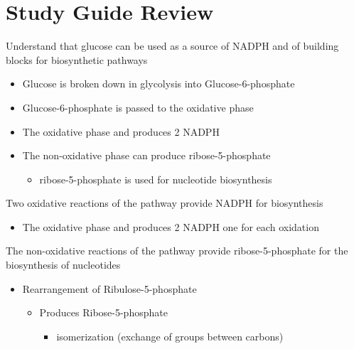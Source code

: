 \documentclass[bigger]{beamer}
\begin{document}
\section{Study Guide Review}
\label{sec:orgf2b6bec}
\begin{frame}[label={sec:org794cd8c}]{Understand that glucose can be used as a source of NADPH \alert{and} of building blocks for biosynthetic pathways}
\begin{itemize}
\item Glucose is broken down in glycolysis into Glucose-6-phosphate
\item Glucose-6-phosphate is passed to the \alert{oxidative phase}
\item The \alert{oxidative phase} and produces \alert{2 NADPH}

\item The \alert{non-oxidative phase} can produce \alert{ribose-5-phosphate}
\begin{itemize}
\item \alert{ribose-5-phosphate} is used for nucleotide biosynthesis
\end{itemize}
\end{itemize}
\end{frame}

\begin{frame}[label={sec:orgad8fb33}]{Two oxidative reactions of the pathway provide NADPH for biosynthesis}
\begin{itemize}
\item The oxidative phase and produces 2 NADPH one for each oxidation
\end{itemize}
\end{frame}

\begin{frame}[label={sec:orgff8d13e}]{The non-oxidative reactions of the pathway provide ribose-5-phosphate for the biosynthesis of nucleotides}
\begin{itemize}
\item Rearrangement of \alert{Ribulose-5-phosphate} 
\begin{itemize}
\item Produces \alert{Ribose-5-phosphate} 
\begin{itemize}
\item isomerization (exchange of groups between carbons)
\end{itemize}
\end{itemize}
\end{itemize}
\end{frame}
\end{document}

